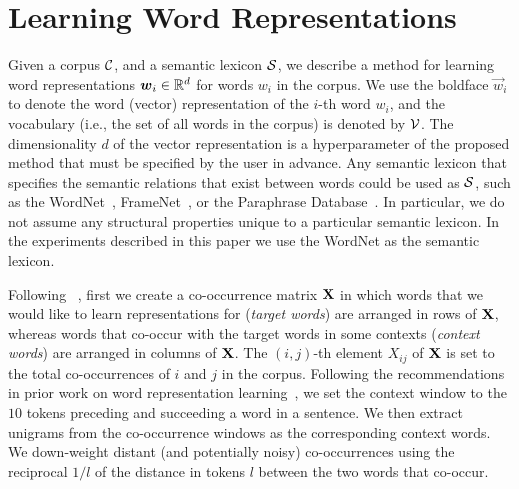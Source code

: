 \documentclass[letterpaper]{article}
\newcommand{\citet}[1]{\citeauthor{#1} \shortcite{#1}}
\newcommand{\citep}{\cite}
\begin{document}
\section{Learning Word Representations}
\label{sec:method}

Given a corpus $\mathcal{C}$, and a semantic lexicon $\mathcal{S}$, we describe a method for learning
word representations $\boldsymbol{w}_i \in \mathbb{R}^d$ for words $w_i$ in the corpus.
We use the boldface $\vec{w}_i$ to denote the word (vector) representation of
the $i$-th word $w_i$, and the vocabulary (i.e., the set of all words in the corpus) is denoted by $\mathcal{V}$.
The dimensionality $d$ of the vector representation is a hyperparameter of the proposed method that must be
specified by the user in advance.  Any semantic lexicon that specifies the semantic relations that exist between words could be used as $\mathcal{S}$,
such as the WordNet~\citep{WordNet}, FrameNet~\citep{baker-fillmore-lowe:1998:ACLCOLING}, or the Paraphrase Database~\citep{ganitkevitch-vandurme-callisonburch:2013:NAACL-HLT}. In particular, we do not assume any structural properties unique to a particular semantic lexicon. In the experiments described in this paper we use the WordNet as the semantic lexicon.

Following~\citet{Pennington:EMNLP:2014}, first we create a co-occurrence matrix $\text{\bf X}$ in which
words that we would like to learn representations for (\emph{target words}) are arranged in rows of $\text{\bf X}$, whereas words
that co-occur with the target words in some contexts (\emph{context words}) are arranged in columns of $\text{\bf X}$.
The $(i,j)$-th element $X_{ij}$ of $\text{\bf X}$ is set to the total co-occurrences of $i$ and $j$ in the corpus.
Following the recommendations in prior work on word representation learning~\citep{Levy:TACL:2015},
we set the context window to the $10$ tokens preceding and succeeding a word in a sentence.
We then extract unigrams from the co-occurrence windows
as the corresponding context words. We down-weight distant (and potentially noisy) co-occurrences
using the reciprocal $1/l$ of the distance in tokens $l$ between the two words that co-occur.
\end{document}
